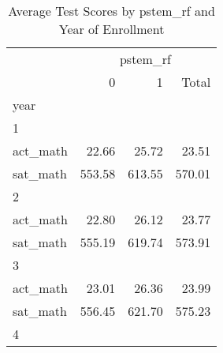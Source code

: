 \begin{table}[!h]
\caption{Average Test Scores by pstem\_rf and Year of Enrollment}
\centering
\begin{tabular}{llll}
\cline{1-4}
\multicolumn{1}{c}{} &
  \multicolumn{3}{|c}{pstem\_rf} \\
\multicolumn{1}{c}{} &
  \multicolumn{1}{|r}{0} &
  \multicolumn{1}{r}{1} &
  \multicolumn{1}{r}{Total} \\
\cline{1-4}
\multicolumn{1}{l}{year} &
  \multicolumn{1}{|r}{} &
  \multicolumn{1}{r}{} &
  \multicolumn{1}{r}{} \\
\multicolumn{1}{l}{\hspace{1em}1} &
  \multicolumn{1}{|r}{} &
  \multicolumn{1}{r}{} &
  \multicolumn{1}{r}{} \\
\multicolumn{1}{l}{\hspace{2em}act\_math} &
  \multicolumn{1}{|r}{22.66} &
  \multicolumn{1}{r}{25.72} &
  \multicolumn{1}{r}{23.51} \\
\multicolumn{1}{l}{\hspace{2em}sat\_math} &
  \multicolumn{1}{|r}{553.58} &
  \multicolumn{1}{r}{613.55} &
  \multicolumn{1}{r}{570.01} \\
\multicolumn{1}{l}{\hspace{1em}2} &
  \multicolumn{1}{|r}{} &
  \multicolumn{1}{r}{} &
  \multicolumn{1}{r}{} \\
\multicolumn{1}{l}{\hspace{2em}act\_math} &
  \multicolumn{1}{|r}{22.80} &
  \multicolumn{1}{r}{26.12} &
  \multicolumn{1}{r}{23.77} \\
\multicolumn{1}{l}{\hspace{2em}sat\_math} &
  \multicolumn{1}{|r}{555.19} &
  \multicolumn{1}{r}{619.74} &
  \multicolumn{1}{r}{573.91} \\
\multicolumn{1}{l}{\hspace{1em}3} &
  \multicolumn{1}{|r}{} &
  \multicolumn{1}{r}{} &
  \multicolumn{1}{r}{} \\
\multicolumn{1}{l}{\hspace{2em}act\_math} &
  \multicolumn{1}{|r}{23.01} &
  \multicolumn{1}{r}{26.36} &
  \multicolumn{1}{r}{23.99} \\
\multicolumn{1}{l}{\hspace{2em}sat\_math} &
  \multicolumn{1}{|r}{556.45} &
  \multicolumn{1}{r}{621.70} &
  \multicolumn{1}{r}{575.23} \\
\multicolumn{1}{l}{\hspace{1em}4} &
  \multicolumn{1}{|r}{} &
  \multicolumn{1}{r}{} &

\end{tabular}
\end{table}
